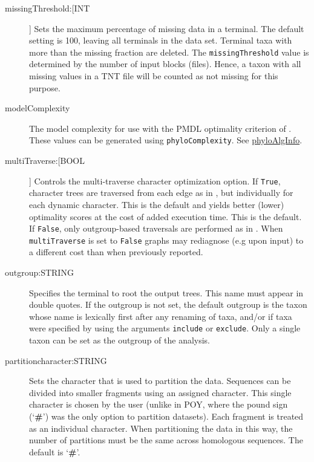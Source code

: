 \begin{description}
		\item[missingThreshold:[INT]] Sets the maximum percentage of missing data 
		in a terminal. The default setting is 100, leaving all terminals in the data set. 
		Terminal taxa with more than the missing fraction are deleted. The 
		\texttt{missingThreshold} value is determined by the number of input blocks 
		(files). Hence, a taxon with all missing values in a TNT file will be counted 
		as not missing for this purpose. 
		
		\item[modelComplexity] The model complexity for use with the PMDL 
		optimality criterion of \citep{WheelerandVaron2025}. These values can be 
		generated using \texttt{phyloComplexity}. See \href{https://github.com/amnh/PhyAlgInfo}
		{phyloAlgInfo}.
		
		\item[multiTraverse:[BOOL]] Controls the multi-traverse character optimization 
		option. If \texttt{True}, character trees are traversed from each edge as in 
		\citep{VaronandWheeler2012,VaronandWheeler2013, POY4, POY5}, but 
		individually for each dynamic character. This is the default and yields better 
		(lower) optimality scores at the cost of added execution time. This is the default.
		If \texttt{False}, only outgroup-based traversals are performed as in 
		\citep{Wheeler1996, POY2, POY3}. When \texttt{multiTraverse} is set to 
		\texttt{False} graphs may rediagnose (e.g upon input) to a different cost than 
		when previously reported. 
					
		\item[outgroup:STRING] Specifies the terminal to root the output trees. 
		This name must appear in double quotes. If the outgroup is not set, the 
		default outgroup is the taxon whose name is lexically first after any renaming 
		of taxa, and/or if taxa were specified by using the arguments \texttt{include} 
		or \texttt{exclude}. Only a single taxon can be set as the outgroup of the analysis. 
					
		\item[partitioncharacter:STRING] Sets the character that is used to partition the 
		data. Sequences can be divided into smaller fragments using an assigned character. 
		This single character is chosen by the user (unlike in POY, where the pound sign 
		(`\textbf{\#}') was the only option to partition datasets). Each fragment is treated as an 
		individual character. When partitioning the data in this way, the number of partitions 
		must be the same across homologous sequences. The default is `\textbf{\#}'.


\end{description}
